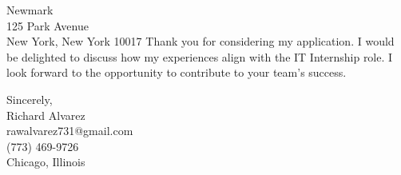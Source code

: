 \documentclass[a4paper,10pt]{letter}
\begin{document}
\begin{letter}{Newmark \\
125 Park Avenue \\
New York, New York 10017
}
Thank you for considering my application. I would be delighted to discuss how my experiences align with the IT Internship role. I look forward to the opportunity to contribute to your team’s success.

\vspace{1em}

Sincerely, \\
Richard Alvarez \\
rawalvarez731@gmail.com \\
(773) 469-9726 \\
Chicago, Illinois

\end{letter}
\end{document}
